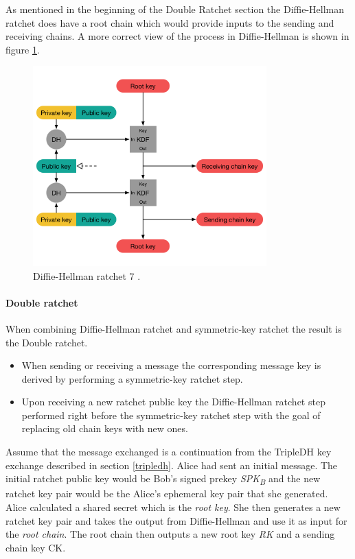 As mentioned in the beginning of the Double Ratchet section the Diffie-Hellman ratchet does have a root chain which would provide inputs to the sending and receiving chains. A more correct view of the process in Diffie-Hellman is shown in figure \ref{fig:dhratchetcon}. 


\begin{figure}[H]
	\centering
	\includegraphics[width=9cm]{figures/dhratchet7.png}
	\caption{Diffie-Hellman ratchet 7 \cite{doubleratchet}.}
	\label{fig:dhratchetcon}
\end{figure}

\paragraph{Double ratchet}

When combining Diffie-Hellman ratchet and symmetric-key ratchet the result is the Double ratchet.

\begin{itemize}
	\item When sending or receiving a message the corresponding message key is derived by performing a symmetric-key ratchet step.
	\item Upon receiving a new ratchet public key the Diffie-Hellman ratchet step performed right before the symmetric-key ratchet step with the goal of replacing old chain keys with new ones.  
\end{itemize}

Assume that the message exchanged is a continuation from the TripleDH key exchange described in section \ref{tripledh}. Alice had sent an initial message. The initial ratchet public key would be Bob's signed prekey \emph{SPK\textsubscript{B}} and the new ratchet key pair would be the Alice's ephemeral key pair that she generated. Alice calculated a shared secret which is the \emph{root key}. She then generates a new ratchet key pair and takes the output from Diffie-Hellman and use it as input for the \emph{root chain}. The root chain then outputs a new root key \emph{RK} and a sending chain key {CK}.

